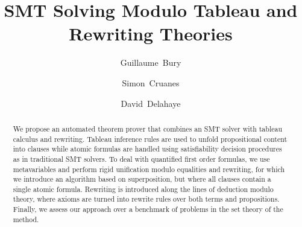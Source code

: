 \documentclass[a4paper]{easychair}
\begin{document}
\title{SMT Solving Modulo Tableau and Rewriting Theories}

\author{Guillaume~Bury \and Simon~Cruanes \and
David~Delahaye}


\maketitle

\begin{abstract}
We propose an automated theorem prover that combines an SMT solver with tableau
calculus and rewriting. Tableau inference rules are used to unfold propositional
content into clauses while atomic formulas are handled using satisfiability
decision procedures as in traditional SMT solvers. To deal with quantified first order
formulas, we use metavariables and perform rigid unification modulo equalities
and rewriting, for which we introduce an algorithm based on superposition, but
where all clauses contain a single atomic formula. Rewriting is introduced along
the lines of deduction modulo theory, where axioms are turned into rewrite rules
over both terms and propositions. Finally, we assess our approach over a
benchmark of problems in the set theory of the \bmth{} method.
\end{abstract}









\end{document}
